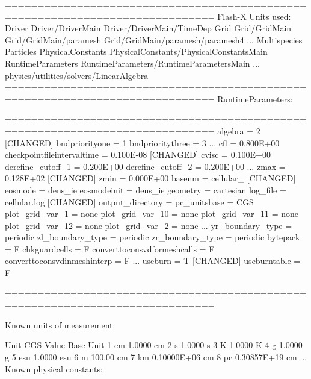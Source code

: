 \begin{codeseg}
 ==============================================================================
  Flash-X Units used:
   Driver
   Driver/DriverMain
   Driver/DriverMain/TimeDep
   Grid
   Grid/GridMain
   Grid/GridMain/paramesh
   Grid/GridMain/paramesh/paramesh4
   ...
   Multispecies
   Particles
   PhysicalConstants
   PhysicalConstants/PhysicalConstantsMain
   RuntimeParameters
   RuntimeParameters/RuntimeParametersMain
   ...
   physics/utilities/solvers/LinearAlgebra
 ==============================================================================
 RuntimeParameters:

 ==============================================================================
algebra                     =          2 [CHANGED]
bndpriorityone              =          1
bndprioritythree            =          3
...
cfl                         =                 0.800E+00
checkpointfileintervaltime  =                 0.100E-08 [CHANGED]
cvisc                       =                 0.100E+00
derefine_cutoff_1           =                 0.200E+00
derefine_cutoff_2           =                 0.200E+00
...
zmax                        =                 0.128E+02 [CHANGED]
zmin                        =                 0.000E+00
basenm                      = cellular_                      [CHANGED]
eosmode                     = dens_ie
eosmodeinit                 = dens_ie
geometry                    = cartesian
log_file                    = cellular.log                   [CHANGED]
output_directory            =
pc_unitsbase                = CGS
plot_grid_var_1             = none
plot_grid_var_10            = none
plot_grid_var_11            = none
plot_grid_var_12            = none
plot_grid_var_2             = none
...
yr_boundary_type            = periodic
zl_boundary_type            = periodic
zr_boundary_type            = periodic
bytepack                    =  F
chkguardcells               =  F
converttoconsvdformeshcalls =  F
converttoconsvdinmeshinterp =  F
...
useburn                     =  T [CHANGED]
useburntable                =  F

 ==============================================================================

 Known units of measurement:

              Unit                          CGS Value                Base Unit
  1                  cm                     1.0000                           cm
  2                   s                     1.0000                            s
  3                   K                     1.0000                            K
  4                   g                     1.0000                            g
  5                 esu                     1.0000                          esu
  6                   m                     100.00                           cm
  7                  km                    0.10000E+06                       cm
  8                  pc                    0.30857E+19                       cm
  ...
 Known physical constants:


\end{codeseg}
